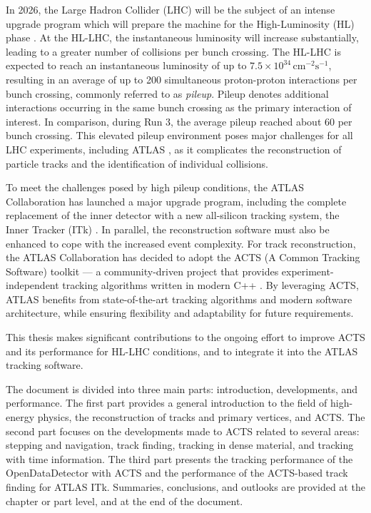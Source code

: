 In 2026, the Large Hadron Collider (LHC) \cite{lhc-tdr} will be the subject of an intense upgrade program which will prepare the machine for the High-Luminosity (HL) phase \cite{hl-lhc-tdr}. At the HL-LHC, the instantaneous luminosity will increase substantially, leading to a greater number of collisions per bunch crossing. The HL-LHC is expected to reach an instantaneous luminosity of up to $7.5 \times 10^{34} \, \text{cm}^{-2}\text{s}^{-1}$, resulting in an average of up to 200 simultaneous proton-proton interactions per bunch crossing, commonly referred to as \textit{pileup}. Pileup denotes additional interactions occurring in the same bunch crossing as the primary interaction of interest. In comparison, during Run 3, the average pileup reached about 60 per bunch crossing. This elevated pileup environment poses major challenges for all LHC experiments, including ATLAS \cite{atlas}, as it complicates the reconstruction of particle tracks and the identification of individual collisions.

To meet the challenges posed by high pileup conditions, the ATLAS Collaboration has launched a major upgrade program, including the complete replacement of the inner detector with a new all-silicon tracking system, the Inner Tracker (ITk) \cite{itk-pixel-tdr}\cite{itk-strip-tdr}. In parallel, the reconstruction software must also be enhanced to cope with the increased event complexity. For track reconstruction, the ATLAS Collaboration has decided to adopt the ACTS (A Common Tracking Software) toolkit \cite{acts-2022} --- a community-driven project that provides experiment-independent tracking algorithms written in modern C++ \cite{atlas-hl-lhc-computing-cdr}. By leveraging ACTS, ATLAS benefits from state-of-the-art tracking algorithms and modern software architecture, while ensuring flexibility and adaptability for future requirements.

This thesis makes significant contributions to the ongoing effort to improve ACTS and its performance for HL-LHC conditions, and to integrate it into the ATLAS tracking software.

The document is divided into three main parts: introduction, developments, and performance. The first part provides a general introduction to the field of high-energy physics, the reconstruction of tracks and primary vertices, and ACTS. The second part focuses on the developments made to ACTS related to several areas: stepping and navigation, track finding, tracking in dense material, and tracking with time information. The third part presents the tracking performance of the OpenDataDetector with ACTS and the performance of the ACTS-based track finding for ATLAS ITk. Summaries, conclusions, and outlooks are provided at the chapter or part level, and at the end of the document.

